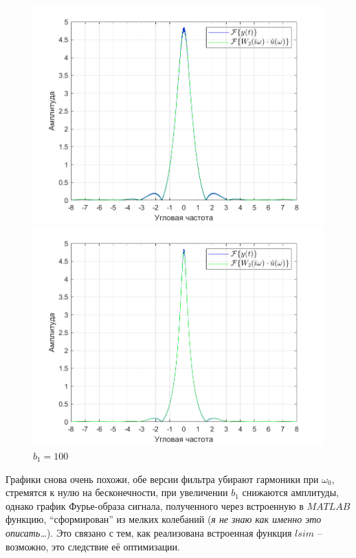 \documentclass[a4paper]{article}
\begin{document}
\begin{figure}[H]
    \begin{minipage}{0.5\textwidth}
        \centering
        \includegraphics[width=\linewidth]{ex1_2/a1=0_a2=25_b1=50_b2=25_d=5/h5.png}
        \caption{$b_1=50$}
    \end{minipage}
    \begin{minipage}{0.5\textwidth}
        \centering
        \includegraphics[width=\linewidth]{ex1_2/a1=0_a2=25_b1=100_b2=25_d=5/h5.png}
        \caption{$b_1=100$}
    \end{minipage}
\end{figure}

Графики снова очень похожи, обе версии фильтра убирают гармоники при $\omega_0$, стремятся к нулю на бесконечности, при увеличении $b_1$ снижаются амплитуды, однако график Фурье-образа сигнала, полученного через встроенную в $MATLAB$ функцию, ``сформирован'' из мелких колебаний (\textit{я не знаю как именно это описать\ldots}). Это связано с тем, как реализована встроенная функция $lsim$ -- возможно, это следствие её оптимизации.
\end{document}
